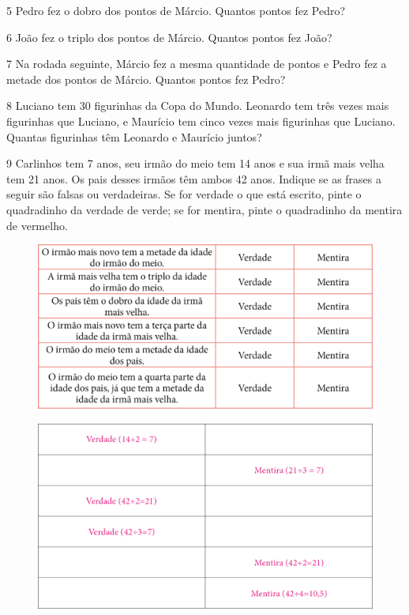 \num{5} Pedro fez o dobro dos pontos de Márcio. Quantos pontos fez Pedro?


\num{6} João fez o triplo dos pontos de Márcio. Quantos pontos fez João?


\num{7} Na rodada seguinte, Márcio fez a mesma quantidade de pontos e Pedro
  fez a metade dos pontos de Márcio. Quantos pontos fez Pedro?


\num{8} Luciano tem 30 figurinhas da Copa do Mundo. Leonardo tem três
vezes mais figurinhas que Luciano, e Maurício tem cinco vezes mais figurinhas que Luciano.
Quantas figurinhas têm Leonardo e Maurício juntos?




\num{9} Carlinhos tem 7 anos, seu irmão do meio tem 14 anos e sua irmã mais
velha tem 21 anos. Os pais desses irmãos têm ambos 42 anos. Indique se
as frases a seguir são falsas ou verdadeiras. Se for verdade o que está
escrito, pinte o quadradinho da verdade de verde; se for mentira,
pinte o quadradinho da mentira de vermelho.

\begin{figure}[htpb!]
\includegraphics[width=\textwidth]{./media/image109.png}
\end{figure}

\begin{figure}[htpb!]
\includegraphics[width=\textwidth]{./media/image110.png}
\end{figure}


